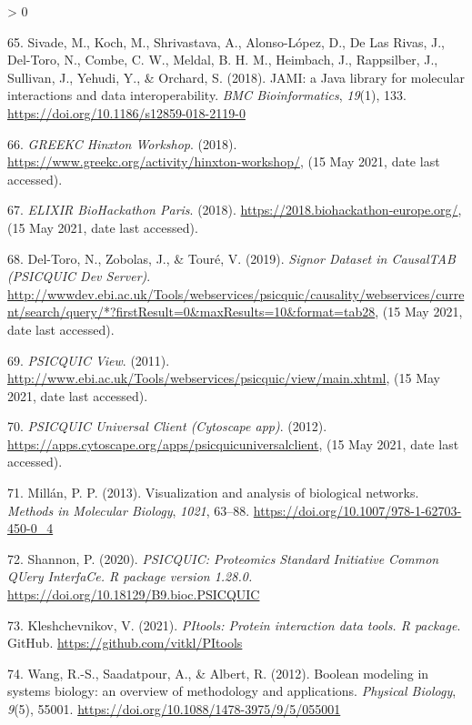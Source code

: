 \documentclass[
  12pt,
]{book}
\newlength{\cslhangindent}
\newenvironment{CSLReferences}[2] %
 {%
  \setlength{\parindent}{0pt}
  \ifodd #1 \everypar{\setlength{\hangindent}{\cslhangindent}}\ignorespaces\fi
  \ifnum #2 > 0
  \setlength{\parskip}{#2\baselineskip}
  \fi
 }%
 {}
\begin{document}
\begin{CSLReferences}{1}{0}
\leavevmode\hypertarget{ref-Sivade2018a}{}%
65. Sivade, M., Koch, M., Shrivastava, A., Alonso-López, D., De Las Rivas, J., Del-Toro, N., Combe, C. W., Meldal, B. H. M., Heimbach, J., Rappsilber, J., Sullivan, J., Yehudi, Y., \& Orchard, S. (2018). {JAMI: a Java library for molecular interactions and data interoperability}. \emph{BMC Bioinformatics}, \emph{19}(1), 133. \url{https://doi.org/10.1186/s12859-018-2119-0}

\leavevmode\hypertarget{ref-Hinxton2018}{}%
66. \emph{{GREEKC Hinxton Workshop}}. (2018). \url{https://www.greekc.org/activity/hinxton-workshop/}, (15 May 2021, date last accessed).

\leavevmode\hypertarget{ref-biohack2018}{}%
67. \emph{{ELIXIR BioHackathon Paris}}. (2018). \url{https://2018.biohackathon-europe.org/}, (15 May 2021, date last accessed).

\leavevmode\hypertarget{ref-psicquic-causalTAB-dataset}{}%
68. Del-Toro, N., Zobolas, J., \& Touré, V. (2019). \emph{{Signor Dataset in CausalTAB (PSICQUIC Dev Server)}}. \url{http://wwwdev.ebi.ac.uk/Tools/webservices/psicquic/causality/webservices/current/search/query/*?firstResult=0\&maxResults=10\&format=tab28}, (15 May 2021, date last accessed).

\leavevmode\hypertarget{ref-psicquic-view}{}%
69. \emph{{PSICQUIC View}}. (2011). \url{http://www.ebi.ac.uk/Tools/webservices/psicquic/view/main.xhtml}, (15 May 2021, date last accessed).

\leavevmode\hypertarget{ref-PSICQUICUniversalClient}{}%
70. \emph{{PSICQUIC Universal Client (Cytoscape app)}}. (2012). \url{https://apps.cytoscape.org/apps/psicquicuniversalclient}, (15 May 2021, date last accessed).

\leavevmode\hypertarget{ref-Millan2013}{}%
71. Millán, P. P. (2013). {Visualization and analysis of biological networks}. \emph{Methods in Molecular Biology}, \emph{1021}, 63--88. \url{https://doi.org/10.1007/978-1-62703-450-0_4}

\leavevmode\hypertarget{ref-Shannon2020}{}%
72. Shannon, P. (2020). \emph{{PSICQUIC: Proteomics Standard Initiative Common QUery InterfaCe. R package version 1.28.0.}} \url{https://doi.org/10.18129/B9.bioc.PSICQUIC}

\leavevmode\hypertarget{ref-Kleshchevnikov2021}{}%
73. Kleshchevnikov, V. (2021). \emph{{PItools: Protein interaction data tools. R package}}. GitHub. \url{https://github.com/vitkl/PItools}

\leavevmode\hypertarget{ref-Wang2012}{}%
74. Wang, R.-S., Saadatpour, A., \& Albert, R. (2012). {Boolean modeling in systems biology: an overview of methodology and applications}. \emph{Physical Biology}, \emph{9}(5), 55001. \url{https://doi.org/10.1088/1478-3975/9/5/055001}


\end{CSLReferences}
\end{document}
